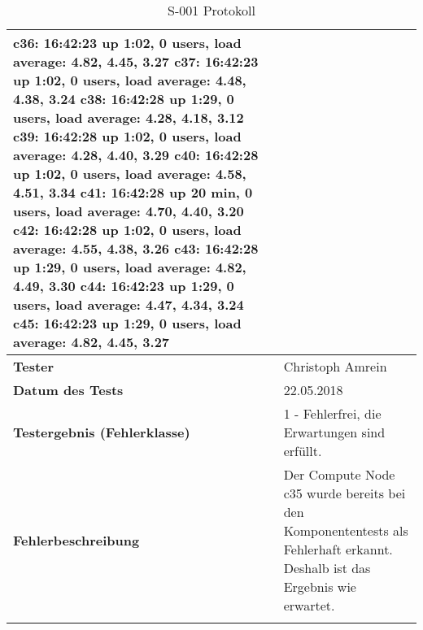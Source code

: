 \begin{longtable}{p{4.5cm}p{11.5cm}}
c36:  16:42:23 up  1:02,  0 users,  load average: 4.82, 4.45, 3.27 \newline
c37:  16:42:23 up  1:02,  0 users,  load average: 4.48, 4.38, 3.24 \newline
c38:  16:42:28 up  1:29,  0 users,  load average: 4.28, 4.18, 3.12 \newline
c39:  16:42:28 up  1:02,  0 users,  load average: 4.28, 4.40, 3.29 \newline
c40:  16:42:28 up  1:02,  0 users,  load average: 4.58, 4.51, 3.34 \newline
c41:  16:42:28 up 20 min,  0 users,  load average: 4.70, 4.40, 3.20 \newline
c42:  16:42:28 up  1:02,  0 users,  load average: 4.55, 4.38, 3.26 \newline
c43:  16:42:28 up  1:29,  0 users,  load average: 4.82, 4.49, 3.30 \newline
c44:  16:42:23 up  1:29,  0 users,  load average: 4.47, 4.34, 3.24 \newline
c45:  16:42:23 up  1:29,  0 users,  load average: 4.82, 4.45, 3.27 
\\\hline
\cellcolor{heading}\textbf{Tester} & Christoph Amrein  \\\hline
\cellcolor{heading}\textbf{Datum des Tests} & 22.05.2018  \\\hline
\cellcolor{heading}\textbf{Testergebnis \newline (Fehlerklasse)} & 1 - Fehlerfrei, die Erwartungen sind erfüllt. \\\hline
\cellcolor{heading}\textbf{Fehlerbeschreibung} & Der Compute Node c35 wurde bereits bei den Komponententests als Fehlerhaft erkannt. Deshalb ist das Ergebnis wie erwartet.  \\\hline
\caption{S-001 Protokoll}
\end{longtable}

